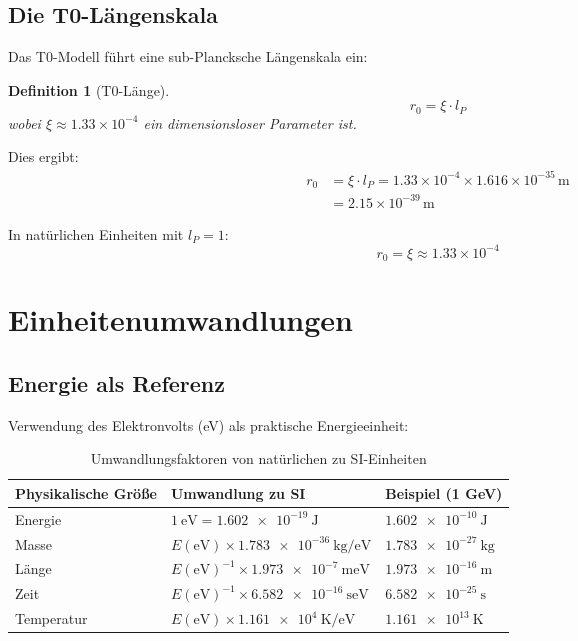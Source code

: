 \documentclass[11pt,a4paper]{article}
\newtheorem{definition}{Definition}[section]
\begin{document}
	\subsection{Die T0-Längenskala}
	
	Das T0-Modell führt eine sub-Plancksche Längenskala ein:
	
	\begin{definition}[T0-Länge]
		\begin{equation}
			r_0 = \xi \cdot l_P
		\end{equation}
		wobei $\xi \approx 1.33 \times 10^{-4}$ ein dimensionsloser Parameter ist.
	\end{definition}
	
	Dies ergibt:
	\begin{align}
		r_0 &= \xi \cdot l_P = 1.33 \times 10^{-4} \times 1.616 \times 10^{-35}\,\text{m} \\
		&= 2.15 \times 10^{-39}\,\text{m}
	\end{align}
	
	In natürlichen Einheiten mit $l_P = 1$:
	\begin{equation}
		r_0 = \xi \approx 1.33 \times 10^{-4}
	\end{equation}
	
	\section{Einheitenumwandlungen}
	
	\subsection{Energie als Referenz}
	
	Verwendung des Elektronvolts (eV) als praktische Energieeinheit:
	
	\begin{table}[htbp]
		\centering
		\begin{adjustbox}{width=0.9\textwidth}
			\begin{tabular}{lll}
				\toprule
				\textbf{Physikalische Größe} & \textbf{Umwandlung zu SI} & \textbf{Beispiel (1 GeV)} \\
				\midrule
				Energie & $\SI{1}{\electronvolt} = \SI{1.602e-19}{\joule}$ & $\SI{1.602e-10}{\joule}$ \\
				Masse & $E(\text{eV}) \times \SI{1.783e-36}{\kilogram\per\electronvolt}$ & $\SI{1.783e-27}{\kilogram}$ \\
				Länge & $E(\text{eV})^{-1} \times \SI{1.973e-7}{\meter\electronvolt}$ & $\SI{1.973e-16}{\meter}$ \\
				Zeit & $E(\text{eV})^{-1} \times \SI{6.582e-16}{\second\electronvolt}$ & $\SI{6.582e-25}{\second}$ \\
				Temperatur & $E(\text{eV}) \times \SI{1.161e4}{\kelvin\per\electronvolt}$ & $\SI{1.161e13}{\kelvin}$ \\
				\bottomrule
			\end{tabular}
		\end{adjustbox}
		\caption{Umwandlungsfaktoren von natürlichen zu SI-Einheiten}
		\label{tab:umwandlungen}
	\end{table}
	
\end{document}
